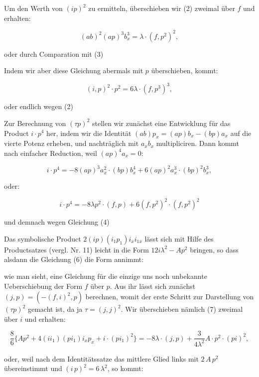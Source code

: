 Um den Werth von $(ip)^2$ zu ermitteln, überschieben wir (2) zweimal
über $f$ und erhalten:

\[ (ab)^2(ap)^3b_x^3 = \lambda\cdot(f,p^2)^2, \]

oder durch Comparation mit (3)


Indem wir aber diese Gleichung abermals mit $p$ überschieben,
kommt:

\[ (i,p)^2\cdot p^2 = 6\lambda\cdot(f,p^3)^3, \]

oder endlich wegen (2)


Zur Berechnung von $(\tau p)^2$ stellen wir zunächst eine Entwicklung für
das Product $i\cdot p^4$ her, indem wir die Identität $(ab)p_x=(ap)b_x-(bp)a_x$
auf die vierte Potenz erheben, und nachträglich mit $a_xb_x$ multipliciren.
Dann kommt nach einfacher Reduction, weil $(ap)^4a_x=0$:

\[ i\cdot p^4 = -8(ap)^3a_x^2\cdot(bp)b_x^4+6(ap)^2a_x^3\cdot(bp)^2b_x^3, \]

oder:

\[ i\cdot p^4 = -8\lambda p^2\cdot(f,p)+6(f,p^2)^2\cdot(f,p^2)^2 \]

und demnach wegen Gleichung (4)


Das symbolische Product $2(ip)(i_1p_1)i_xi_{1x}$ lässt sich mit Hilfe des
Productsatzes (vergl. Nr. 11) leicht in die Form $12i\lambda^2-Ap^2$ bringen,
so dass alsdann die Gleichung (6) die Form annimmt:


wie man sieht, eine Gleichung für die einzige uns noch unbekannte
Ueberschiebung der Form $f$ über $p$. Aus ihr lässt sich zunächst
$(j,p)=(-(f,i)^2,p)$ berechnen, womit der erste Schritt zur Darstellung
 von $(\tau p)^2$ gemacht ist, da ja $\tau=(j,j)^2$. Wir überschieben
nämlich (7) zweimal über $i$ und erhalten:

\[ \frac{8}{6}\{Ap^2+4(ii_1)(pi_1)i_xp_x+i\cdot(pi_1)^2\} = -8\lambda\cdot(j,p)+\frac{3}{4\lambda^2}A\cdot p^2\cdot(pi)^2, \]


oder, weil nach dem Identit\"atssatze das mittlere Glied links mit $2\,A\,p^2$ \"ubereinstimmt und $(i\,p)^2 = 6\,\lambda^2$, so kommt:

